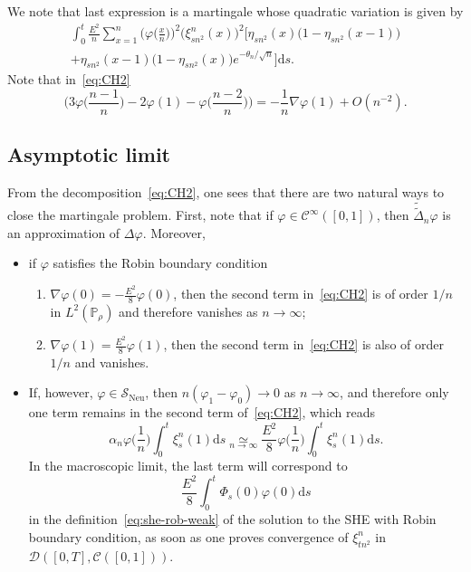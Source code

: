\documentclass[AHL,Unicode,longabstracts]{cedram}
\DeclareMathOperator{\Neu}{Neu}
\newcommand{\bb}[1]{{\mathbb #1}}
\newcommand{\mc}[1]{{\mathcal #1}}
\renewcommand{\mc}[1]{{\mathcal #1}}
\newcommand{\SN}{\ensuremath{\mc S_{\Neu}}}
\renewcommand{\tilde}{\widetilde}
\newcommand*{\dd}{\mathrm{d}}
\newcommand*{\ds}{\dd s}
\newcommand*{\romanenumi}{\renewcommand*{\theenumi}{\roman{enumi}}}
\renewcommand{\tfrac}{\frac}
\begin{document}
We note that last expression is a martingale whose quadratic variation is given by
\begin{multline}\label{eq:QV-CH}
\int_0^t \frac{E^2}{n} \sum_{x=1}^n\Big(\varphi\Big(\tfrac x n\Big)\Big)^2\big(\xi_{{sn^2}}^n(x)\big)^2 \Big[\eta_{sn^2}(x)\big(1-\eta_{sn^2}(x-1)\big) \\ + \eta_{sn^2}(x-1)\big(1-\eta_{sn^2}(x)\big) e^{-\theta_n/\sqrt n}\Big]\ds.
\end{multline}
Note that in~\eqref{eq:CH2}
\[
\Big(3\varphi\Big(\tfrac{n-1}{n}\Big)-2\varphi(1)-\varphi\Big(\tfrac{n-2}{n}\Big)\Big)=-\tfrac{1}{n}\nabla \varphi(1)+ O(n^{-2}).
\]

\subsection{Asymptotic limit}

From the decomposition~\eqref{eq:CH2}, one sees that there are two natural ways to close the martingale problem. First, note that if $\varphi \in \mc C^\infty([0,1])$, then $\tilde{\tilde\Delta}_n\varphi$ is an approximation of $\Delta\varphi$. Moreover,
\begin{itemize}
\item if $\varphi$ satisfies the Robin boundary condition
\begin{enumerate}\romanenumi
\item $\nabla\varphi(0) = -\frac{E^2}{8}\varphi(0)$, then the second term in~\eqref{eq:CH2} is of order $1/n$ in $L^2(\bb P_\rho)$ and therefore vanishes as $n\to\infty$;

\item $\nabla\varphi(1)= \frac{E^2}{8}\varphi(1)$, then the second term in~\eqref{eq:CH2} is also of order $1/ n$ and vanishes.
\end{enumerate}

\item If, however, $\varphi \in \SN$, then $n(\varphi_1-\varphi_0) \to 0$ as $n\to\infty$, and therefore only one term remains in the second term of~\eqref{eq:CH2}, which reads
\[
\alpha_n \varphi\Big(\tfrac 1 n\Big)\int_0^t \xi_s^n(1)\ds \underset{n\to\infty}{\simeq} \tfrac{E^2}{8} \varphi\Big(\tfrac 1 n\Big)\int_0^t\xi_s^n(1)\ds.
\]
In the macroscopic limit, the last term will correspond to
\[
\tfrac{E^2}{8} \int_0^t \Phi_s(0)\varphi(0)\ds
\]
in the definition~\eqref{eq:she-rob-weak} of the solution to the SHE with Robin boundary condition, as soon as one proves convergence of $\xi_{{tn^2}}^n$ in ${\mc D}([0,T],\mc C([0,1]))$.
\end{itemize}
\end{document}
